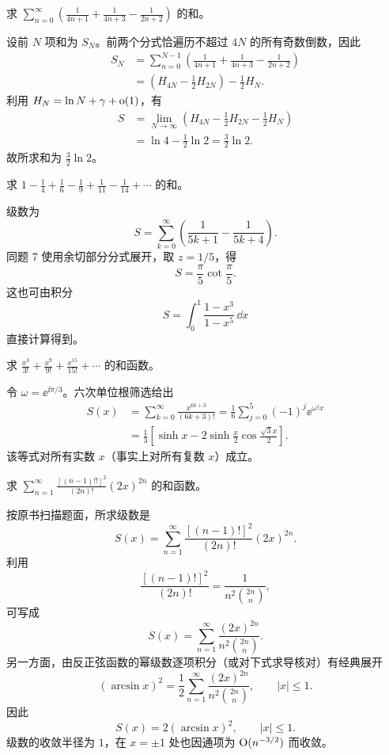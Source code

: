 \begin{xexercise}[10]
求 $\displaystyle\sum_{n=0}^{\infty}\left(\frac1{4n+1}+\frac1{4n+3}-\frac1{2n+2}\right)$ 的和。
\end{xexercise}
\begin{xsolution}
设前 $N$ 项和为 $S_N$。前两个分式恰遍历不超过 $4N$ 的所有奇数倒数，因此
\[
\begin{aligned}
  S_N
  &=\sum_{n=0}^{N-1}\left(\frac1{4n+1}+\frac1{4n+3}-\frac1{2n+2}\right)\\
  &=\left(H_{4N}-\frac12H_{2N}\right)-\frac12H_N.
\end{aligned}
\]
利用 $H_N=\ln N+\gamma+\mathrm{o}(1)$，有
\[
\begin{aligned}
  S
  &=\lim_{N\to\infty}\left(H_{4N}-\frac12H_{2N}-\frac12H_N\right)\\
  &=\ln4-\frac12\ln2=\frac32\ln2.
\end{aligned}
\]
故所求和为 $\frac32\ln2$。
\end{xsolution}


\begin{xexercise}[11]
求 $\displaystyle 1-\frac14+\frac16-\frac19+\frac1{11}-\frac1{14}+\cdots$ 的和。
\end{xexercise}
\begin{xsolution}
级数为
\[
  S=\sum_{k=0}^{\infty}\left(\frac1{5k+1}-\frac1{5k+4}\right).
\]
同题 7 使用余切部分分式展开，取 $z=1/5$，得
\[
  S=\frac\pi5\cot\frac\pi5.
\]
这也可由积分
\[
  S=\int_0^1\frac{1-x^3}{1-x^5}\,\dd x
\]
直接计算得到。
\end{xsolution}


\begin{xexercise}[12]
求 $\displaystyle \frac{x^3}{3!}+\frac{x^9}{9!}+\frac{x^{15}}{15!}+\cdots$ 的和函数。
\end{xexercise}
\begin{xsolution}
令 $\omega=\ee^{\ii\pi/3}$。六次单位根筛选给出
\[
\begin{aligned}
  S(x)
  &=\sum_{k=0}^{\infty}\frac{x^{6k+3}}{(6k+3)!}
   =\frac16\sum_{j=0}^5(-1)^j\ee^{\omega^jx}\\
  &=\frac13\left[
    \sinh x-2\sinh\frac x2\cos\frac{\sqrt3x}{2}
  \right].
\end{aligned}
\]
该等式对所有实数 $x$（事实上对所有复数 $x$）成立。
\end{xsolution}


\begin{xexercise}[13]
求 $\displaystyle\sum_{n=1}^{\infty}\frac{[(n-1)!!]^2}{(2n)!}(2x)^{2n}$ 的和函数。
\end{xexercise}
\begin{xsolution}
按原书扫描题面，所求级数是
\[
  S(x)=\sum_{n=1}^{\infty}
  \frac{[(n-1)!]^2}{(2n)!}(2x)^{2n}.
\]
利用
\[
  \frac{[(n-1)!]^2}{(2n)!}
  =\frac1{n^2\binom{2n}{n}},
\]
可写成
\[
  S(x)=\sum_{n=1}^{\infty}
  \frac{(2x)^{2n}}{n^2\binom{2n}{n}}.
\]
另一方面，由反正弦函数的幂级数逐项积分（或对下式求导核对）有经典展开
\[
  (\arcsin x)^2
  =\frac12\sum_{n=1}^{\infty}
  \frac{(2x)^{2n}}{n^2\binom{2n}{n}},
  \qquad |x|\leqslant1.
\]
因此
\[
  S(x)=2(\arcsin x)^2,\qquad |x|\leqslant1.
\]
级数的收敛半径为 $1$，在 $x=\pm1$ 处也因通项为 $\mathrm{O}(n^{-3/2})$ 而收敛。
\end{xsolution}


